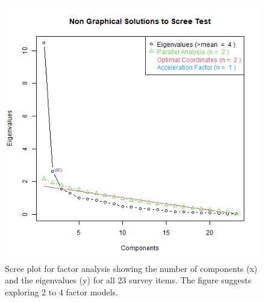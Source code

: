 \documentclass[020-persona\_validation.tex]{subfiles}
\begin{document}
    \begin{figure}[htb]
        \centering
        \includegraphics[scale=0.5]{figs/010-validation/efa_eigen_scree.png}
        \caption[Scree plot for factor analysis]
        {Scree plot for factor analysis showing the number of components (x) and the eigenvalues (y) for all 23 survey items.
            The figure suggests exploring 2 to 4 factor models.
        }
        \label{fig:scree-fa-all}
    \end{figure}
\end{document}
